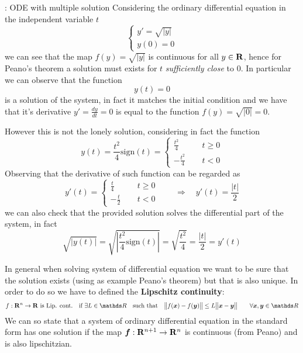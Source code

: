 	\begin{example}{: ODE with multiple solution} \label{ex:ode:multisol}
		Considering the ordinary differential equation in the independent variable $t$
		\[ \begin{cases}
			y' = \sqrt{|y|} \\ y(0) = 0
		\end{cases} \]
		we can see that the map $f(y) = \sqrt{|y|}$ is continuous for all $y\in \mathbf{R}$, hence for Peano's theorem a solution must exists for $t$ \textit{sufficiently close} to $0$. In particular we can observe that the function
		\[y(t) = 0 \]
		is a solution of the system, in fact it matches the initial condition and we have that it's derivative $y' = \frac{dy}{dt} = 0$ is equal to the function $f(y) = \sqrt{|0|} = 0$.
		
		However this is not the lonely solution, considering in fact the function
		\[ y(t) = \frac{t^2}{4} \textrm{sign}(t) = \begin{cases}
			\frac{t^2}4 \qquad & t \geq 0 \\
			-\frac{t^2}4 & t < 0
		\end{cases} \]
		Observing that the derivative of such function can be regarded as
		\[ y'(t) = \begin{cases}
			\frac{t}4 \qquad & t \geq 0 \\
			-\frac{t}2 & t < 0
		\end{cases} \qquad \Rightarrow \quad y'(t) = \frac{|t|}{2} \]
		we can also check that the provided solution solves the differential part of the system, in fact
		\[ \sqrt{|y(t)|} = \sqrt{\left| \frac{t^2}{4} \textrm{sign}(t) \right|} = \sqrt{\frac{t^2}{4}} = \frac{|t|}{2} = y'(t) \]
	\end{example}
	In general when solving system of differential equation we want to be sure that the solution exists (using as example Peano's theorem) but that is also unique. In order to do so we have to defined the \textbf{Lipschitz continuity}:
	\begin{equation} \label{eq:ode:lipschitz}
		f:\R^n\rightarrow \R \textrm{ is Lip. cont.} \quad \textrm{if } \exists L \in \mathds R \quad \textrm{such that} \quad \big\| f(\vett x) - f(\vett y) \big\| \leq L\big\|\vett x - \vett y\big\| \qquad \forall \vett x,\vett y \in \mathds R 
	\end{equation}
	We can so state that a system of ordinary differential equation in the standard form has one solution if the map $\boldsymbol{f}:\mathbf{R}^{n+1}\rightarrow \mathbf{R}^n$ is continuous (from Peano) and is also lipschitzian.
	
